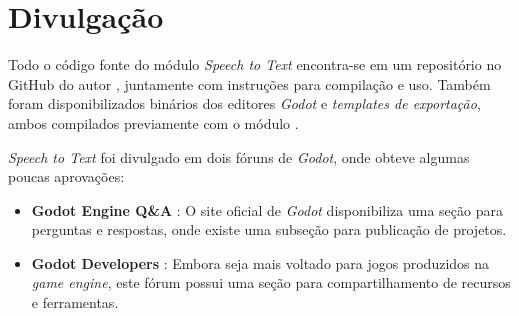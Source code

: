 \section{Divulgação}
\label{modulePublishing}

Todo o código fonte do módulo \textit{Speech to Text} encontra-se em um repositório no GitHub do autor \citep{sttModuleGitHub}, juntamente com instruções para compilação e uso. Também foram disponibilizados binários dos editores \textit{Godot} e \textit{templates de exportação}, ambos compilados previamente com o módulo \citep{sttModuleDownload}.

\textit{Speech to Text} foi divulgado em dois fóruns de \textit{Godot}, onde obteve algumas poucas aprovações:

\begin{itemize}
\item \textbf{Godot Engine Q\&A} \citep{sttModuleGodotQA}: O site oficial de \textit{Godot} disponibiliza uma seção para perguntas e respostas, onde existe uma subseção para publicação de projetos.

\item \textbf{Godot Developers} \citep{sttModuleGodotDevelopers}: Embora seja mais voltado para jogos produzidos na \textit{game engine}, este fórum possui uma seção para compartilhamento de recursos e ferramentas.
\end{itemize}
